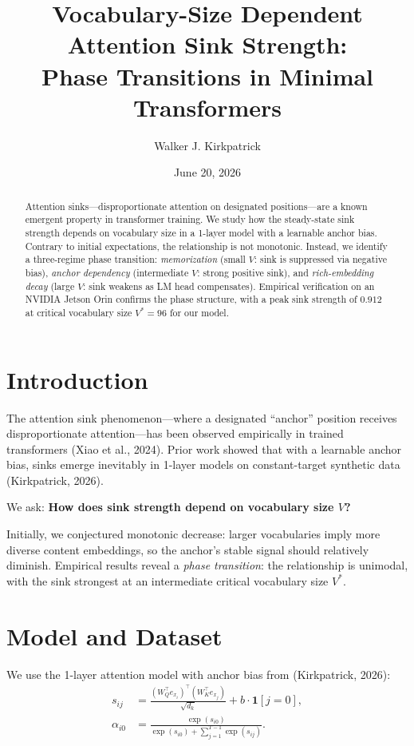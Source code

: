 \documentclass[11pt,a4paper]{amsart}
\title{Vocabulary-Size Dependent Attention Sink Strength:\\Phase Transitions in Minimal Transformers}
\author{Walker J. Kirkpatrick}
\date{June 20, 2026}
\theoremstyle{plain}
\theoremstyle{definition}
\begin{document}
\maketitle

\begin{abstract}
Attention sinks---disproportionate attention on designated positions---are
a known emergent property in transformer training. We study how the
steady-state sink strength depends on vocabulary size in a 1-layer model
with a learnable anchor bias. Contrary to initial expectations, the
relationship is not monotonic. Instead, we identify a three-regime
phase transition: \emph{memorization} (small $V$: sink is suppressed
via negative bias), \emph{anchor dependency} (intermediate $V$: strong
positive sink), and \emph{rich-embedding decay} (large $V$: sink weakens
as LM head compensates). Empirical verification on an NVIDIA Jetson
Orin confirms the phase structure, with a peak sink strength of $0.912$
at critical vocabulary size $V^*=96$ for our model.
\end{abstract}

\section{Introduction}

The attention sink phenomenon---where a designated ``anchor'' position
receives disproportionate attention---has been observed empirically in
trained transformers (Xiao et al., 2024). Prior work showed that with a
learnable anchor bias, sinks emerge inevitably in 1-layer models on
constant-target synthetic data (Kirkpatrick, 2026).

We ask: \textbf{How does sink strength depend on vocabulary size $V$?}

Initially, we conjectured monotonic decrease: larger vocabularies imply
more diverse content embeddings, so the anchor's stable signal should
relatively diminish. Empirical results reveal a \emph{phase transition}:
the relationship is unimodal, with the sink strongest at an intermediate
critical vocabulary size $V^*$.

\section{Model and Dataset}

We use the 1-layer attention model with anchor bias from
(Kirkpatrick, 2026):
\begin{align*}
s_{ij} &= \frac{(W_Q^\top e_{x_i})^\top(W_K^\top e_{x_j})}{\sqrt{d_k}}
+ b\cdot\mathbf{1}[j=0], \\
\alpha_{i0} &= \frac{\exp(s_{i0})}{\exp(s_{i0})+\sum_{j=1}^{T-1}\exp(s_{ij})}.
\end{align*}
\end{document}
